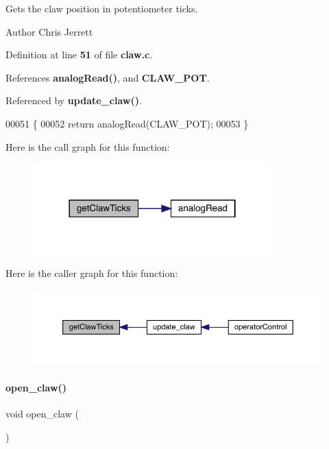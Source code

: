 Gets the claw position in potentiometer ticks. 

\begin{DoxyAuthor}{Author}
Chris Jerrett 
\end{DoxyAuthor}


Definition at line \textbf{ 51} of file \textbf{ claw.\+c}.



References \textbf{ analog\+Read()}, and \textbf{ C\+L\+A\+W\+\_\+\+P\+OT}.



Referenced by \textbf{ update\+\_\+claw()}.


\begin{DoxyCode}
00051                            \{
00052   \textcolor{keywordflow}{return} analogRead(CLAW_POT);
00053 \}
\end{DoxyCode}
Here is the call graph for this function\+:\nopagebreak
\begin{figure}[H]
\begin{center}
\leavevmode
\includegraphics[width=261pt]{claw_8c_addd2004effae7c94400aed1fe6a90ead_cgraph}
\end{center}
\end{figure}
Here is the caller graph for this function\+:\nopagebreak
\begin{figure}[H]
\begin{center}
\leavevmode
\includegraphics[width=350pt]{claw_8c_addd2004effae7c94400aed1fe6a90ead_icgraph}
\end{center}
\end{figure}
\mbox{\label{claw_8c_a03023ca28f671b9fa7bac07782ccd8c1}} 
\paragraph{open\+\_\+claw()}
{\footnotesize\ttfamily void open\+\_\+claw (\begin{DoxyParamCaption}{ }\end{DoxyParamCaption})}



